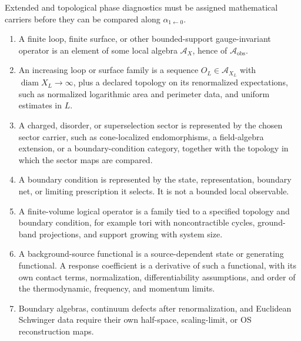 \begin{definition}
\label{def:extended-phase-data-carriers}
Extended and topological phase diagnostics must be assigned mathematical
carriers before they can be compared along
\(\alpha_{1\leftarrow0}\).
\begin{enumerate}
\item A finite loop, finite surface, or other bounded-support gauge-invariant
  operator is an element of some local algebra \(\mathcal A_X\), hence of
  \(\mathcal A_{\mathrm{obs}}\).
\item An increasing loop or surface family is a sequence
  \(O_L\in\mathcal A_{X_L}\) with \(\operatorname{diam}X_L\to\infty\), plus a
  declared topology on its renormalized expectations, such as normalized
  logarithmic area and perimeter data, and uniform estimates in \(L\).
\item A charged, disorder, or superselection sector is represented by the
  chosen sector carrier, such as cone-localized endomorphisms, a field-algebra
  extension, or a boundary-condition category, together with the topology in
  which the sector maps are compared.
\item A boundary condition is represented by the state, representation, boundary
  net, or limiting prescription it selects.  It is not a bounded local
  observable.
\item A finite-volume logical operator is a family tied to a specified
  topology and boundary condition, for example tori with noncontractible
  cycles, ground-band projections, and support growing with system size.
\item A background-source functional is a source-dependent state or generating
  functional.  A response coefficient is a derivative of such a functional,
  with its own contact terms, normalization, differentiability assumptions, and
  order of the thermodynamic, frequency, and momentum limits.
\item Boundary algebras, continuum defects after renormalization, and Euclidean
  Schwinger data require their own half-space, scaling-limit, or OS
  reconstruction maps.
\end{enumerate}
\end{definition}

